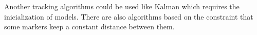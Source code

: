 Another tracking algorithms could be used like Kalman \cite{kalman} which requires the inicialization of models. There are also algorithms based on the constraint that some markers keep a constant distance between them.

%
%
%
%
%
%
%
%
%
